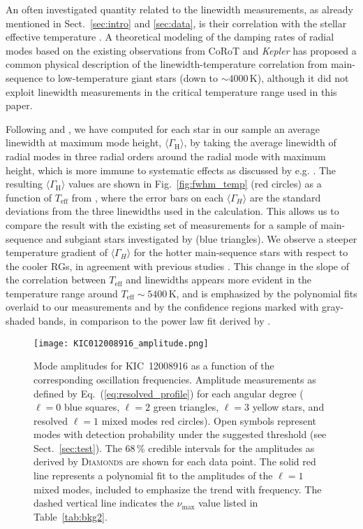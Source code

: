\documentclass[structabstract]{aa}
\newcommand{\kepler}{\textit{Kepler} }
\newcommand{\numax}{\nu_\mathrm{max}}
\newcommand{\diamonds}{\textsc{D\large{iamonds}}}
\newcommand{\kic}{KIC~12008916}
\begin{document}
An often investigated quantity related to the linewidth measurements, as already mentioned in Sect.~\ref{sec:intro} and \ref{sec:data}, is their correlation with the stellar effective temperature \citep[e.g. see][for more results and details]{Hekker10,Baudin11temp,App12fwhm,Belkacem12,Corsaro12}. A theoretical modeling of the damping rates of radial modes based on the existing observations from CoRoT and \kepler \citep{Belkacem12} has proposed a common physical description of the linewidth-temperature correlation from main-sequence to low-temperature giant stars (down to $\sim 4000$\,K), although it did not exploit linewidth measurements in the critical temperature range used in this paper.

Following \cite{Baudin11temp} and \cite{App12fwhm}, we have computed for each star in our sample an average linewidth at maximum mode height, $\langle \Gamma_\mathrm{H} \rangle$, by taking the average linewidth of radial modes in three radial orders around the radial mode with maximum height, which is more immune to systematic effects as discussed by e.g. \cite{App12fwhm}. The resulting $\langle \Gamma_\mathrm{H} \rangle$ values are shown in Fig.~\ref{fig:fwhm_temp} (red circles) as a function of $T_\mathrm{eff}$ from \cite{Pin12}, where the error bars on each $\langle \Gamma_H \rangle$ are the standard deviations from the three linewidths used in the calculation. This allows us to compare the result with the existing set of measurements for a sample of main-sequence and subgiant stars investigated by \cite{App12fwhm} (blue triangles). 
We observe a steeper temperature gradient of $\langle \Gamma_H \rangle$ for the hotter main-sequence stars with respect to the cooler RGs, in agreement with previous studies \citep{Baudin11temp,Belkacem12}. This change in the slope of the correlation between $T_\mathrm{eff}$ and linewidths appears more evident in the temperature range around $T_\mathrm{eff} \sim 5400$\,K, and is emphasized by the polynomial fits overlaid to our measurements and by the confidence regions marked with gray-shaded bands, in comparison to the power law fit derived by \cite{App12fwhm}.

\begin{figure}
   \centering
   \texttt{[image: KIC012008916\_amplitude.png]}
      \caption{Mode amplitudes for \kic\,\,as a function of the corresponding oscillation frequencies. Amplitude measurements as defined by Eq.~(\ref{eq:resolved_profile}) for each angular degree ($\ell = 0$ blue squares, $\ell = 2$ green triangles, $\ell = 3$ yellow stars, and resolved $\ell = 1$ mixed modes red circles). Open symbols represent modes with detection probability under the suggested threshold (see Sect.~\ref{sec:test}). The 68\,\% credible intervals for the amplitudes as derived by \diamonds\,\,are shown for each data point. The solid red line represents a polynomial fit to the amplitudes of the $\ell = 1$ mixed modes, included to emphasize the trend with frequency. The dashed vertical line indicates the $\numax$ value listed in Table~\ref{tab:bkg2}.}
    \label{fig:amplitude}
\end{figure}
\end{document}
